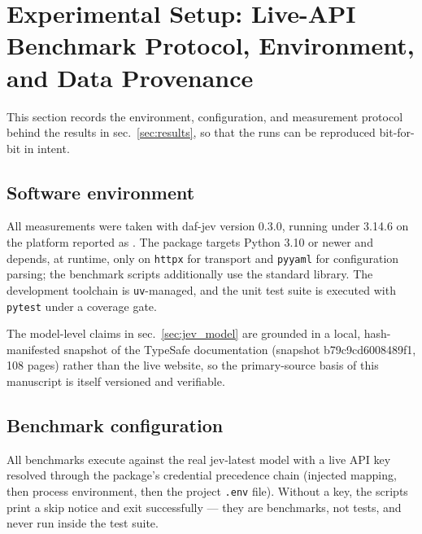 \documentclass[
  english,
]{article}
\begin{document}
\newpage

\section{Experimental Setup: Live-API Benchmark Protocol, Environment,
and Data Provenance}\label{sec:experimental_setup}

This section records the environment, configuration, and measurement
protocol behind the results in sec.~\ref{sec:results}, so that the runs
can be reproduced bit-for-bit in intent.

\subsection{Software environment}\label{software-environment}

All measurements were taken with daf-jev version 0.3.0, running under
3.14.6 on the platform reported as
. The package targets Python
3.10 or newer and depends, at runtime, only on \texttt{httpx} for
transport and \texttt{pyyaml} for configuration parsing; the benchmark
scripts additionally use the standard library. The development toolchain
is \texttt{uv}-managed, and the unit test suite is executed with
\texttt{pytest} under a coverage gate.

The model-level claims in sec.~\ref{sec:jev_model} are grounded in a
local, hash-manifested snapshot of the TypeSafe documentation (snapshot
b79c9cd6008489f1, 108 pages) rather than the live website, so the
primary-source basis of this manuscript is itself versioned and
verifiable.

\subsection{Benchmark configuration}\label{benchmark-configuration}

All benchmarks execute against the real jev-latest model with a live API
key resolved through the package's credential precedence chain (injected
mapping, then process environment, then the project \texttt{.env} file).
Without a key, the scripts print a skip notice and exit successfully ---
they are benchmarks, not tests, and never run inside the test suite.
\end{document}
